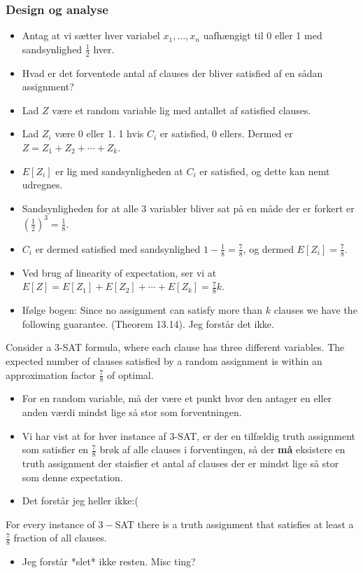 \documentclass{beamer}
\begin{document}
\begin{frame}[allowframebreaks]
  \frametitle{Design og analyse}

  \begin{itemize}
  \item Antag at vi sætter hver variabel $x_{1}, \ldots, x_{n}$ uafhængigt til 0 eller 1 med sandsynlighed $\frac{1}{2}$ hver. 
  \item Hvad er det forventede antal af clauses der bliver satisfied af en sådan assignment? 
  \item Lad $Z$ være et random variable lig med antallet af satisfied clauses. 
  \item Lad $Z_{i}$ være 0 eller 1. 1 hvis $C_{i}$ er satisfied, 0 ellers. Dermed er $Z = Z_{1} + Z_2 + \cdots + Z_{k}$. 
  \item $E[Z_{i}]$ er lig med sandsynligheden at $C_{i}$ er satisfied, og dette kan nemt udregnes.
  \item Sandsynligheden for at alle 3 variabler bliver sat på en måde der er forkert er $ \left( \frac{1}{2} \right)^{3} = \frac{1}{8}  $.
  \item $C_i$ er dermed satisfied med sandsynlighed $ 1 - \frac{1}{8} = \frac{7}{8}$, og dermed $E[Z_{i}] = \frac{7}{8}$.
  \item Ved brug af linearity of expectation, ser vi at $E[Z] = E[Z_{1}] + E[Z_{2}] + \cdots + E[Z_{k}] = \frac{7}{8}k$.
  \item Ifølge bogen: Since no assignment can satisfy more than $k$ clauses we have the following guarantee. (Theorem 13.14). Jeg forstår det ikke.
  \end{itemize}

  \begin{theorem}[13.14]
Consider a 3-SAT formula, where each clause has three different variables. The expected number of clauses satisfied by a random assignment is within an approximation factor $\frac{7}{8}$ of optimal.
\end{theorem}

\begin{itemize}
\item For en random variable, må der være et punkt hvor den antager en eller anden værdi mindst lige så stor som forventningen. 
\item Vi har vist at for hver instance af 3-SAT, er der en tilfældig truth assignment som satisfier en $\frac{7}{8}$ brøk af alle clauses i forventingen, så der \textbf{må} eksistere  en truth assignment der staisfier et antal af clauses der er mindst lige så stor som denne expectation.
\item Det forstår jeg heller ikke:(
\end{itemize}

\begin{theorem}[13.15]
For every instance of $3-$SAT there is a truth assignment that satisfies at least a $\frac{7}{8}$ fraction of all clauses.
\end{theorem}

\begin{itemize}
\item Jeg forstår *slet* ikke resten. Misc ting? 
\end{itemize}
  
\end{frame}
\end{document}
